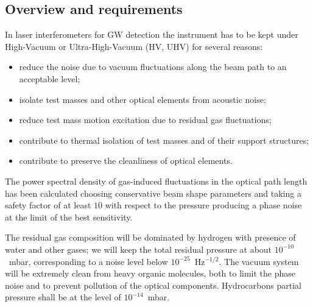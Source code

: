 \subsection{Overview and requirements}
\label{Sec:Vacuum:Intro}
In laser interferometers for GW detection the instrument has to be kept under High-Vacuum or Ultra-High-Vacuum (HV, UHV) for several reasons: 
\begin{itemize} 
\item reduce the noise due to vacuum fluctuations along the beam path to an acceptable level; 
\item isolate test masses and other optical elements from acoustic noise; 
\item reduce test mass motion excitation due to residual gas fluctuations;
\item contribute to thermal isolation of test masses and of their support structures; 
\item contribute to preserve the cleanliness of optical elements. 
\end{itemize} 
The power spectral density of gas-induced fluctuations in the optical path length has been calculated choosing conservative beam shape parameters and taking a safety factor of at least $10$ with respect to the pressure producing a phase noise at the limit of the best sensitivity.

The residual gas composition will be dominated by hydrogen with presence of water and other gases; we will keep the total residual pressure at about $10^{-10}$~mbar, corresponding to a noise level below $10^{-25}$~Hz$^{-1/2}$.
The vacuum system will be extremely clean from heavy organic molecules, both to limit the phase noise and to prevent pollution of the optical components. Hydrocarbons partial pressure shall be at the level of $10^{-14}$~mbar.


